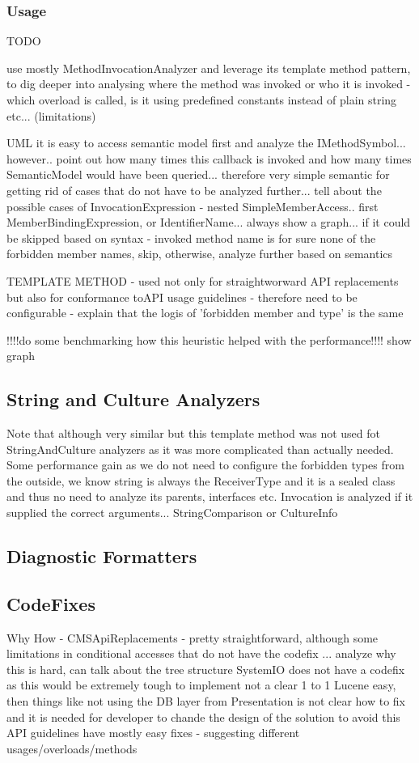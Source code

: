 \documentclass[
  digital, %
  table,   %
  lof,     %
  lot,     %
  oneside,
]{fithesis3}
\begin{document}
 

\subsubsection{Usage}
TODO

use mostly MethodInvocationAnalyzer and leverage its template method pattern, to dig deeper into analysing where the method was invoked or who it is invoked - which overload is called, is it using predefined constants instead of plain string etc... (limitations)


UML 
it is easy to access semantic model first and analyze the IMethodSymbol... however.. point out how many times this callback is invoked and how many times SemanticModel would have been queried... therefore very simple semantic for getting rid of cases that do not have to be analyzed further... tell about the possible cases of InvocationExpression - nested SimpleMemberAccess.. first MemberBindingExpression, or IdentifierName... always show a graph...
if it could be skipped based on syntax - invoked method name is for sure none of the forbidden member names, skip, otherwise, analyze further based on semantics

TEMPLATE METHOD - used not only for straightworward API replacements but also for conformance toAPI usage guidelines - therefore need to be configurable - explain that the logis of 'forbidden member and type' is the same

!!!!do some benchmarking how this heuristic helped with the performance!!!! show graph

\subsection{String and Culture Analyzers}
Note that although very similar but this template method was not used fot StringAndCulture analyzers as it was more complicated than actually needed. Some performance gain as we do not need to configure the forbidden types from the outside, we know string is always the ReceiverType and it is a sealed class and thus no need to analyze its parents, interfaces etc.
Invocation is analyzed if it supplied the correct arguments... StringComparison or CultureInfo

\subsection{Diagnostic Formatters}

\subsection{CodeFixes}
Why
How - CMSApiReplacements - pretty straightforward, although some limitations in conditional accesses that do not have the codefix ... analyze why this is hard, can talk about the tree structure
SystemIO does not have a codefix as this would be extremely tough to implement not a clear 1 to 1
Lucene easy, then things like not using the DB layer from Presentation is not clear how to fix and it is needed for developer to chande the design of the solution to avoid this
API guidelines have mostly easy fixes - suggesting different usages/overloads/methods
\end{document}
